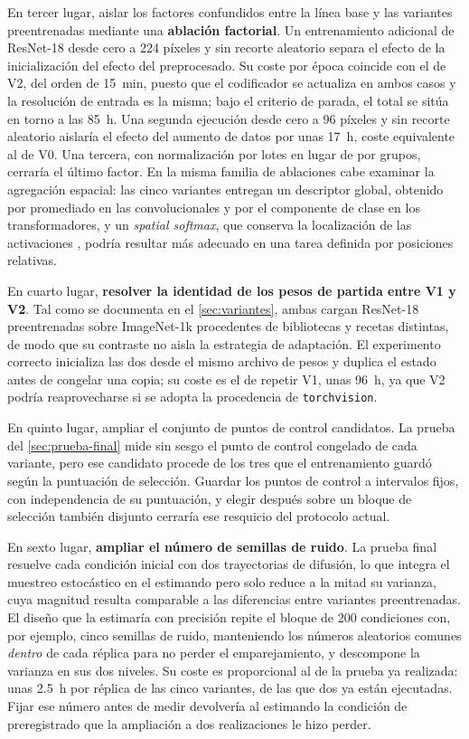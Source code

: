 En tercer lugar, aislar los factores confundidos entre la l\'inea base y las variantes
preentrenadas mediante una \textbf{ablaci\'on factorial}. Un entrenamiento adicional de
ResNet-18 desde cero a \num{224} p\'ixeles y sin recorte aleatorio separa el efecto de la
inicializaci\'on del efecto del preprocesado. Su coste por \'epoca coincide con el de V2,
del orden de \SI{15}{\minute}, puesto que el codificador se actualiza en ambos casos y la
resoluci\'on de entrada es la misma; bajo el criterio de parada, el total se sit\'ua en
torno a las \SI{85}{\hour}. Una segunda ejecuci\'on desde cero a \num{96} p\'ixeles y sin
recorte aleatorio aislar\'ia el efecto del aumento de datos por unas \SI{17}{\hour}, coste
equivalente al de V0. Una tercera, con normalizaci\'on por lotes en lugar de por grupos,
cerrar\'ia el \'ultimo factor. En la misma familia de ablaciones cabe examinar la
agregaci\'on espacial: las cinco variantes entregan un descriptor global, obtenido por
promediado en las convolucionales y por el componente de clase en los transformadores, y
un \textit{spatial softmax}, que conserva la localizaci\'on de las activaciones
\cite{levine2016visuomotor}, podr\'ia resultar m\'as adecuado en una tarea definida por
posiciones relativas.

En cuarto lugar, \textbf{resolver la identidad de los pesos de partida entre V1 y V2}. Tal
como se documenta en el \cref{sec:variantes}, ambas cargan ResNet-18 preentrenadas sobre
ImageNet-1k procedentes de bibliotecas y recetas distintas, de modo que su contraste no
aisla la estrategia de adaptaci\'on. El experimento correcto inicializa las dos desde el
mismo archivo de pesos y duplica el estado antes de congelar una copia; su coste es el de
repetir V1, unas \SI{96}{\hour}, ya que V2 podr\'ia reaprovecharse si se adopta la
procedencia de \texttt{torchvision}.

En quinto lugar, ampliar el conjunto de puntos de control candidatos. La prueba del
\cref{sec:prueba-final} mide sin sesgo el punto de control congelado de cada variante,
pero ese candidato procede de los tres que el entrenamiento guard\'o seg\'un la
puntuaci\'on de selecci\'on. Guardar los puntos de control a intervalos fijos, con
independencia de su puntuaci\'on, y elegir despu\'es sobre un bloque de selecci\'on tambi\'en
disjunto cerrar\'ia ese resquicio del protocolo actual.

En sexto lugar, \textbf{ampliar el n\'umero de semillas de ruido}. La prueba final resuelve
cada condici\'on inicial con dos trayectorias de difusi\'on, lo que integra el muestreo
estoc\'astico en el estimando pero solo reduce a la mitad su varianza, cuya magnitud resulta
comparable a las diferencias entre variantes preentrenadas. El dise\~no que la estimar\'ia
con precisi\'on repite el bloque de \num{200} condiciones con, por ejemplo, cinco semillas
de ruido, manteniendo los n\'umeros aleatorios comunes \emph{dentro} de cada r\'eplica para
no perder el emparejamiento, y descompone la varianza en sus dos niveles. Su coste es
proporcional al de la prueba ya realizada: unas \SI{2.5}{\hour} por r\'eplica de las cinco
variantes, de las que dos ya est\'an ejecutadas. Fijar ese n\'umero antes de medir
devolver\'ia al estimando la condici\'on de preregistrado que la ampliaci\'on a dos
realizaciones le hizo perder.

